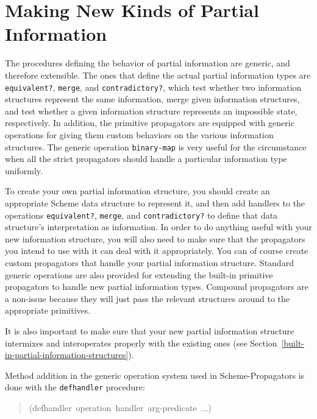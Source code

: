 \documentclass[12pt,letterpaper,english]{article}
\begin{document}

\section{Making New Kinds of Partial Information}
\label{making-new-kinds-of-partial-information}

The procedures defining the behavior of partial information are
generic, and therefore extensible.  The ones that define the
actual partial information types are \texttt{equivalent?}, \texttt{merge}, and
\texttt{contradictory?}, which test whether two information structures
represent the same information, merge given information structures,
and test whether a given information structure represents an
impossible state, respectively.  In addition, the primitive
propagators are equipped with generic operations for giving them
custom behaviors on the various information structures.  The
generic operation \texttt{binary-map} is very useful for the circumstance
when all the strict propagators should handle a particular
information type uniformly.

To create your own partial information structure, you should create an
appropriate Scheme data structure to represent it, and then add
handlers to the operations \texttt{equivalent?}, \texttt{merge}, and
\texttt{contradictory?} to define that data structure's interpretation as
information.  In order to do anything useful with your new information
structure, you will also need to make sure that the propagators you
intend to use with it can deal with it appropriately.  You can of
course create custom propagators that handle your partial information
structure.  Standard generic operations are also provided for
extending the built-in primitive propagators to handle new partial
information types.  Compound propagators are a non-issue because they
will just pass the relevant structures around to the appropriate
primitives.

It is also important to make sure that your new partial information
structure intermixes and interoperates properly with the existing
ones (see Section~\ref{built-in-partial-information-structures}).

Method addition in the generic operation system used in
Scheme-Propagators is done with the \texttt{defhandler} procedure:
\begin{quote}{\ttfamily \raggedright \noindent
(defhandler~operation~handler~arg-predicate~...)
}\end{quote}
\end{document}
